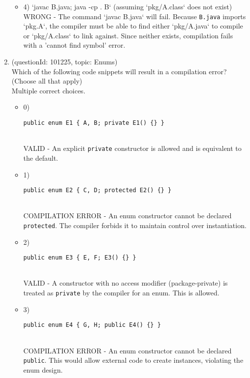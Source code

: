 \documentclass[12pt]{article}
\begin{document}
\begin{enumerate}[label=(\arabic*)]
\begin{itemize}
\item 4) `javac B.java; java -cp . B` (assuming `pkg/A.class` does not exist)
 \\ 
WRONG - The command `javac B.java` will fail. Because \verb|B.java| imports `pkg.A`, the compiler must be able to find either `pkg/A.java` to compile or `pkg/A.class` to link against. Since neither exists, compilation fails with a 'cannot find symbol' error.

\end{itemize}
\item (questionId: 101225, topic: Enums) \\ 
Which of the following code snippets will result in a compilation error? (Choose all that apply)
\\ \noindent Multiple correct choices. 
\begin{itemize}
\item 0) \begin{verbatim}public enum E1 { A, B; private E1() {} }\end{verbatim}
 \\ 
VALID - An explicit \verb|private| constructor is allowed and is equivalent to the default.

\item 1) \begin{verbatim}public enum E2 { C, D; protected E2() {} }\end{verbatim}
 \\ 
COMPILATION ERROR - An enum constructor cannot be declared \verb|protected|. The compiler forbids it to maintain control over instantiation.

\item 2) \begin{verbatim}public enum E3 { E, F; E3() {} }\end{verbatim}
 \\ 
VALID - A constructor with no access modifier (package-private) is treated as \verb|private| by the compiler for an enum. This is allowed.

\item 3) \begin{verbatim}public enum E4 { G, H; public E4() {} }\end{verbatim}
 \\ 
COMPILATION ERROR - An enum constructor cannot be declared \verb|public|. This would allow external code to create instances, violating the enum design.


\end{itemize}
\end{enumerate}
\end{document}
